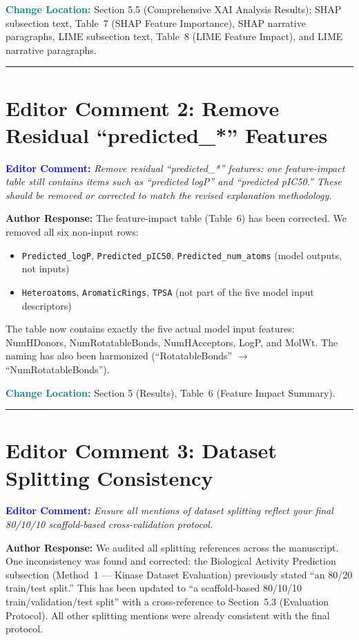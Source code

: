 \documentclass[12pt]{article}
\newcommand{\EC}[1]{\textbf{\textcolor{blue}{Editor Comment:}} \textit{#1}\vspace{0.3em}}
\newcommand{\AR}[1]{\textbf{Author Response:} #1\vspace{0.8em}}
\newcommand{\CH}[1]{\textbf{\textcolor{teal}{Change Location:}} #1\vspace{0.5em}}
\begin{document}
\CH{Section 5.5 (Comprehensive XAI Analysis Results): SHAP subsection text, Table~7 (SHAP Feature Importance), SHAP narrative paragraphs, LIME subsection text, Table~8 (LIME Feature Impact), and LIME narrative paragraphs.}

\bigskip
\hrule
\bigskip

\section*{Editor Comment 2: Remove Residual ``predicted\_*'' Features}

\EC{Remove residual ``predicted\_*'' features: one feature-impact table still contains items such as ``predicted logP'' and ``predicted pIC50.'' These should be removed or corrected to match the revised explanation methodology.}

\AR{The feature-impact table (Table~6) has been corrected. We removed all six non-input rows:
\begin{itemize}[nosep]
\item \texttt{Predicted\_logP}, \texttt{Predicted\_pIC50}, \texttt{Predicted\_num\_atoms} (model outputs, not inputs)
\item \texttt{Heteroatoms}, \texttt{AromaticRings}, \texttt{TPSA} (not part of the five model input descriptors)
\end{itemize}
The table now contains exactly the five actual model input features: NumHDonors, NumRotatableBonds, NumHAcceptors, LogP, and MolWt. The naming has also been harmonized (``RotatableBonds'' $\to$ ``NumRotatableBonds'').}

\CH{Section 5 (Results), Table~6 (Feature Impact Summary).}

\bigskip
\hrule
\bigskip

\section*{Editor Comment 3: Dataset Splitting Consistency}

\EC{Ensure all mentions of dataset splitting reflect your final 80/10/10 scaffold-based cross-validation protocol.}

\AR{We audited all splitting references across the manuscript. One inconsistency was found and corrected: the Biological Activity Prediction subsection (Method~1 --- Kinase Dataset Evaluation) previously stated ``an 80/20 train/test split.'' This has been updated to ``a scaffold-based 80/10/10 train/validation/test split'' with a cross-reference to Section~5.3 (Evaluation Protocol). All other splitting mentions were already consistent with the final protocol.}
\end{document}
